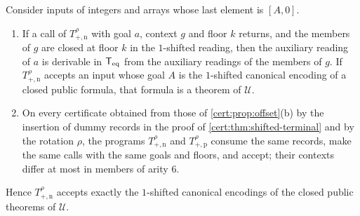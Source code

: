 
\begin{proposition}\label{cert:prop:parity-dispatch}
Consider inputs of integers and arrays whose last element is $[A,0]$.
\begin{enumerate}[label=(\alph*)]
\item If a call of $T^{\rho}_{+,\mathrm n}$ with goal $a$, context $g$ and floor $k$
returns, and the members of $g$ are closed at floor $k$ in the $1$-shifted reading,
then the auxiliary reading of $a$ is derivable in $\mathsf{T}_{\mathrm{eq}}$ from the auxiliary readings
of the members of $g$. If $T^{\rho}_{+,\mathrm n}$ accepts an input whose goal $A$ is
the $1$-shifted canonical encoding of a closed public formula, that formula is a
theorem of $\mathcal U$.
\item On every certificate obtained from those of \cref{cert:prop:offset}(b) by the
insertion of dummy records in the proof of \cref{cert:thm:shifted-terminal} and by the
rotation $\rho$, the programs $T^{\rho}_{+,\mathrm n}$ and $T^{\rho}_{+,\mathrm p}$
consume the same records, make the same calls with the same goals and floors, and
accept; their contexts differ at most in members of arity $6$.
\end{enumerate}
Hence $T^{\rho}_{+,\mathrm n}$ accepts exactly the $1$-shifted canonical encodings of
the closed public theorems of $\mathcal U$.
\end{proposition}
